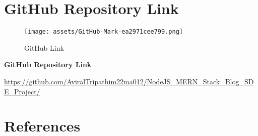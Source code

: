 \documentclass[12pt]{article}
\begin{document}
\clearpage

\section{GitHub Repository Link}

\begin{figure}[H]
    \centering
    \texttt{[image: assets/GitHub-Mark-ea2971cee799.png]}
    \caption{GitHub Link}
    \label{fig:logo}
\end{figure}

\textbf{\Large GitHub Repository Link}

\large
\url{https://github.com/AviralTripathim22ma012/NodeJS_MERN_Stack_Blog_SDE_Project/}

\clearpage

\section{References}
\end{document}

